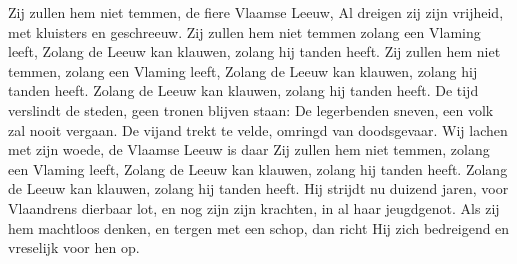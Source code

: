 \beginverse*
Zij zullen hem niet temmen, 
de fiere Vlaamse Leeuw,
Al dreigen zij zijn vrijheid,
met kluisters en geschreeuw.
Zij zullen hem niet temmen
\endverse
\beginverse*
zolang een Vlaming leeft,
Zolang de Leeuw kan klauwen, 
zolang hij tanden heeft.
Zij zullen hem niet temmen,
zolang een Vlaming leeft,
Zolang de Leeuw kan klauwen, 
zolang hij tanden heeft.
Zolang de Leeuw kan klauwen,
zolang hij tanden heeft.
\endverse
\beginverse*
De tijd verslindt de steden, 
geen tronen blijven staan:
De legerbenden sneven, 
een volk zal nooit vergaan.
De vijand trekt te velde, 
omringd van doodsgevaar.
Wij lachen met zijn woede, 
de Vlaamse Leeuw is daar
\endverse
\beginverse*
Zij zullen hem niet temmen,
zolang een Vlaming leeft,
Zolang de Leeuw kan klauwen, 
zolang hij tanden heeft.
Zolang de Leeuw kan klauwen, 
zolang hij tanden heeft.
\endverse
\beginverse*
Hij strijdt nu duizend jaren,
voor Vlaandrens dierbaar lot,
en nog zijn zijn krachten,
in al haar jeugdgenot.
Als zij hem machtloos denken,
en tergen met een schop,
dan richt Hij zich bedreigend
en vreselijk voor hen op.
\endverse
\endsong